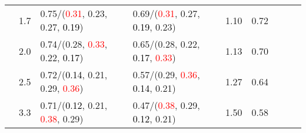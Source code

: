 \documentclass[10pt,a4paper]{report}
\begin{document}
\begin{table}[!htbp]
\begin{center}
{\begin{tabular}{ccllccccc}
				  & 1.7                               & 0.75/(\textcolor{red}{0.31}, 0.23, 0.27, \textcolor{black}{0.19})                                 & 0.69/(\textcolor{red}{0.31}, 0.27, \textcolor{black}{0.19}, 0.23)                                 & 1.10             & 0.72                     \\
				  & 2.0                               & 0.74/(0.28, \textcolor{red}{0.33}, 0.22, \textcolor{black}{0.17})                                 & 0.65/(0.28, 0.22, \textcolor{black}{0.17}, \textcolor{red}{0.33})                                 & 1.13             & 0.70                     \\
				  & 2.5                               & 0.72/(\textcolor{black}{0.14}, 0.21, 0.29, \textcolor{red}{0.36})                                 & 0.57/(0.29, \textcolor{red}{0.36}, \textcolor{black}{0.14}, 0.21)                                 & 1.27             & 0.64                     \\
				  & 3.3                               & 0.71/(\textcolor{black}{0.12}, 0.21, \textcolor{red}{0.38}, 0.29)                                 & 0.47/(\textcolor{red}{0.38}, 0.29, \textcolor{black}{0.12}, 0.21)                                 & 1.50             & 0.58                     \\
				\bottomrule
			\end{tabular}}
	\end{center}
\end{table}
\end{document}
